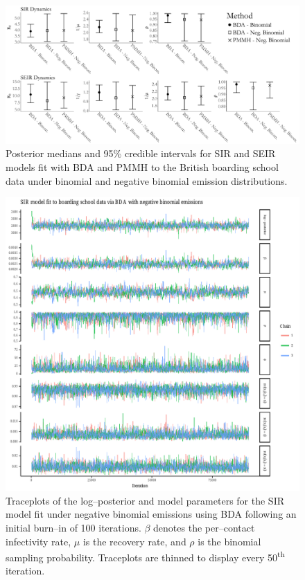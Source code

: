 \begin{figure}[htbp]
	\centering
	\includegraphics[width=\linewidth]{figures/bbs_negbinom_credint_comp.pdf}
	\caption[Posterior estimates of SIR and SEIR model parameters for models fit under negative binomial emissions.]{Posterior medians and 95\% credible intervals for SIR and SEIR models fit with BDA and PMMH to the British boarding school data under binomial and negative binomial emission distributions.}
	\label{fig:bbs_negbinom_credint_comp}
\end{figure}


\begin{figure}[htbp]
	\centering
	\includegraphics[width=\linewidth]{figures/bbs_sir_bda_negbinom_traceplots.pdf}
	\caption[Traceplots of SIR model parameters fit to boarding school data using Bayesian data augmentation.]{Traceplots of the log--posterior and model parameters for the SIR model fit under negative binomial emissions using BDA following an initial burn--in of 100 iterations. $ \beta $ denotes the per--contact infectivity rate, $ \mu $ is the recovery rate, and $ \rho $ is the binomial sampling probability. Traceplots are thinned to display every 50\textsuperscript{th} iteration.}
	\label{fig:bbs_sir_bda_negbinom_traceplots}
\end{figure}

